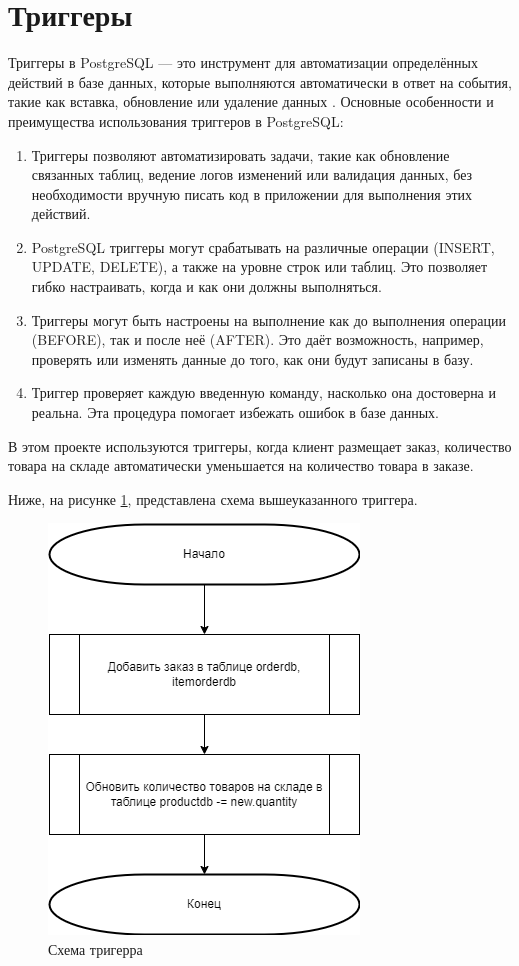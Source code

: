 \section{Триггеры}
Триггеры в PostgreSQL --- это инструмент для автоматизации определённых действий в базе данных, которые выполняются автоматически в ответ на события, такие как вставка, обновление или удаление данных \cite{4}. Основные особенности и преимущества использования триггеров в PostgreSQL:
\begin{enumerate}
	\item Триггеры позволяют автоматизировать задачи, такие как обновление связанных таблиц, ведение логов изменений или валидация данных, без необходимости вручную писать код в приложении для выполнения этих действий.
	\item  PostgreSQL триггеры могут срабатывать на различные операции (INSERT, UPDATE, DELETE), а также на уровне строк или таблиц. Это позволяет гибко настраивать, когда и как они должны выполняться.
	\item Триггеры могут быть настроены на выполнение как до выполнения операции (BEFORE), так и после неё (AFTER). Это даёт возможность, например, проверять или изменять данные до того, как они будут записаны в базу.
	\item Триггер проверяет каждую введенную команду, насколько она достоверна и реальна. Эта процедура помогает избежать ошибок в базе данных.
\end{enumerate}

В этом проекте используются триггеры, когда клиент размещает заказ, количество товара на складе автоматически уменьшается на количество товара в заказе.

Ниже, на рисунке \ref{img:trigger}, представлена схема вышеуказанного триггера.
\begin{figure}[ht!]
	\centering
	\includegraphics[width=0.65\linewidth]{img/trigger.png}
	\caption{Схема тригерра}
	\label{img:trigger}
\end{figure}


